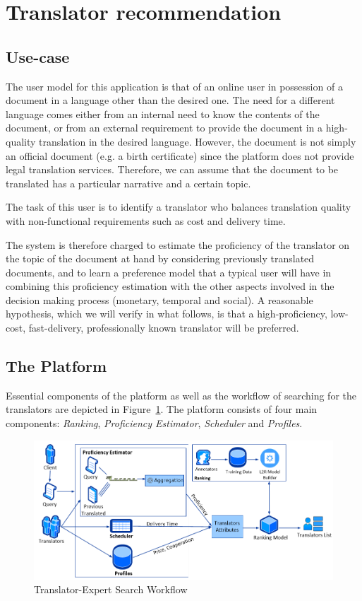 \section{Translator recommendation}
\label{sec:casestudy}
\subsection{Use-case}\label{sec:usecase}
The user model for this application is that of an online user in possession of a document in a language other than the desired one. The need for a different language comes either from an internal need to know the contents of the document, or from an external requirement to provide the document in a high-quality translation in the desired language. However, the document is not simply an official document (e.g. a birth certificate) since the platform does not provide legal translation services. Therefore, we can assume that the document to be translated has a particular narrative and a certain topic. 

The task of this user is to identify a translator who balances translation quality with non-functional requirements such as cost and delivery time.  

The system is therefore charged to estimate the proficiency of the translator on the topic of the document at hand by considering previously translated documents, and to learn a preference model that a typical user will have in combining this proficiency estimation with the other aspects involved in the decision making process (monetary, temporal and social). A reasonable hypothesis, which we will verify in what follows, is that a high-proficiency, low-cost, fast-delivery, professionally known translator will be preferred. 

\subsection{The Platform}\label{sec:platform}
Essential components of the platform as well as the workflow of searching for the translators are depicted in Figure~\ref{fig:architecture}. The platform consists of four main components: \textit{Ranking}, \textit{Proficiency Estimator}, \textit{Scheduler} and \textit{Profiles}.

\begin{figure}
\begin{center}
\includegraphics[width=12cm]{figures/dataflow.png}
\caption{Translator-Expert Search Workflow
\label{fig:architecture}}
\end{center}
\end{figure}

